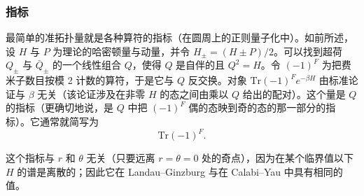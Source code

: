 
\subsubsection*{指标}

最简单的准拓扑量就是各种算符的指标（在圆周上的正则量子化中）。如前所述，设 $H$ 与 $P$ 为理论的哈密顿量与动量，并令 $H_{\pm}=(H\pm P)/2$。可以找到超荷 $Q_{\pm}$ 与 $\bar Q_{\pm}$ 的一个线性组合 $Q$，使得 $Q$ 是自伴的且 $Q^{2}=H$。令 $(-1)^{F}$ 为把费米子数目按模 2 计数的算符，于是它与 $Q$ 反交换。对象 $\mathrm{Tr}(-1)^{F}e^{-\beta H}$ 由标准论证与 $\beta$ 无关（该论证涉及在非零 $H$ 的态之间由乘以 $Q$ 给出的配对）。这个量是 $Q$ 的指标（更确切地说，是 $Q$ 中把 $(-1)^{F}$ 偶的态映到奇的态的那一部分的指标）。它通常就简写为
\begin{equation}
\tag{3.26}
\mathrm{Tr}(-1)^{F}.
\end{equation}


这个指标与 $r$ 和 $\theta$ 无关（只要远离 $r=\theta=0$ 处的奇点），因为在某个临界值以下 $H$ 的谱是离散的；因此它在 Landau--Ginzburg 与在 Calabi--Yau 中具有相同的值。

